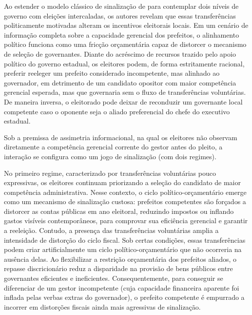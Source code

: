 Ao estender o modelo clássico de sinalização de \textcite{rogoff1990} para contemplar dois níveis de governo com eleições intercaladas, os autores revelam que essas transferências politicamente motivadas alteram os incentivos eleitorais locais. Em um cenário de informação completa sobre a capacidade gerencial dos prefeitos, o alinhamento político funciona como uma fricção orçamentária capaz de distorcer o mecanismo de seleção de governantes. Diante do acréscimo de recursos trazido pelo apoio político do governo estadual, os eleitores podem, de forma estritamente racional, preferir reeleger um prefeito considerado incompetente, mas alinhado ao governador, em detrimento de um candidato opositor com maior competência gerencial esperada, mas que governaria sem o fluxo de transferências voluntárias. De maneira inversa, o eleitorado pode deixar de reconduzir um governante local competente caso o oponente seja o aliado preferencial do chefe do executivo estadual.

Sob a premissa de assimetria informacional, na qual os eleitores não observam diretamente a competência gerencial corrente do gestor antes do pleito, a interação se configura como um jogo de sinalização (com dois regimes).

No primeiro regime, caracterizado por transferências voluntárias pouco expressivas, os eleitores continuam priorizando a seleção do candidato de maior competência administrativa. Nesse contexto, o ciclo político-orçamentário emerge como um mecanismo de sinalização custosa: prefeitos competentes são forçados a distorcer as contas públicas em ano eleitoral, reduzindo impostos ou inflando gastos visíveis contemporâneos, para comprovar sua eficiência gerencial e garantir a reeleição. Contudo, a presença das transferências voluntárias amplia a intensidade de distorção do ciclo fiscal. Sob certas condições, essas transferências podem criar artificialmente um ciclo político-orçamentário que não ocorreria na ausência delas. Ao flexibilizar a restrição orçamentária dos prefeitos aliados, o repasse discricionário reduz a disparidade na provisão de bens públicos entre governantes eficientes e ineficientes. Consequentemente, para conseguir se diferenciar de um gestor incompetente (cuja capacidade financeira aparente foi inflada pelas verbas extras do governador), o prefeito competente é empurrado a incorrer em distorções fiscais ainda mais agressivas de sinalização.

